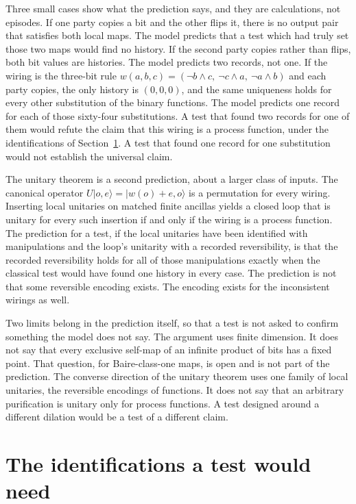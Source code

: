 \documentclass[11pt]{article}
\begin{document}
Three small cases show what the prediction says, and they are calculations, not episodes. If one party copies a bit and the other flips it, there is no output pair that satisfies both local maps. The model predicts that a test which had truly set those two maps would find no history. If the second party copies rather than flips, both bit values are histories. The model predicts two records, not one. If the wiring is the three-bit rule \(w(a,b,c)=(\lnot b\land c,\ \lnot c\land a,\ \lnot a\land b)\) and each party copies, the only history is \((0,0,0)\), and the same uniqueness holds for every other substitution of the binary functions. The model predicts one record for each of those sixty-four substitutions. A test that found two records for one of them would refute the claim that this wiring is a process function, under the identifications of Section~\ref{sec:id}. A test that found one record for one substitution would not establish the universal claim.

The unitary theorem is a second prediction, about a larger class of inputs. The canonical operator \(U\lvert o,e\rangle=\lvert w(o)+e,o\rangle\) is a permutation for every wiring. Inserting local unitaries on matched finite ancillas yields a closed loop that is unitary for every such insertion if and only if the wiring is a process function. The prediction for a test, if the local unitaries have been identified with manipulations and the loop's unitarity with a recorded reversibility, is that the recorded reversibility holds for all of those manipulations exactly when the classical test would have found one history in every case. The prediction is not that some reversible encoding exists. The encoding exists for the inconsistent wirings as well.

Two limits belong in the prediction itself, so that a test is not asked to confirm something the model does not say. The argument uses finite dimension. It does not say that every exclusive self-map of an infinite product of bits has a fixed point. That question, for Baire-class-one maps, is open and is not part of the prediction. The converse direction of the unitary theorem uses one family of local unitaries, the reversible encodings of functions. It does not say that an arbitrary purification is unitary only for process functions. A test designed around a different dilation would be a test of a different claim.

\section{The identifications a test would need}
\label{sec:id}
\end{document}
